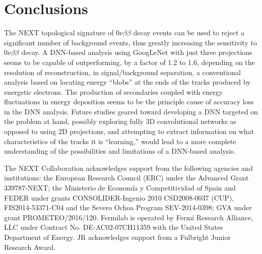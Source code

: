 \documentclass[a4paper,11pt]{article}
\begin{document}
\section{Conclusions}
The NEXT topological signature of $0\nu\beta\beta$ decay events can be used to reject a significant number of background events, thus greatly increasing the sensitivity to $0\nu\beta\beta$ decay.  A DNN-based analysis using GoogLeNet with just three projections seems to be capable of outperforming, by a factor of 1.2 to 1.6, depending on the resolution of reconstruction, in signal/background separation, a conventional analysis based on locating energy ``blobs'' at the ends of the tracks produced by energetic electrons.  The production of secondaries coupled with energy fluctuations in energy deposition seems to be the principle cause of accuracy loss in the DNN analysis.  Future studies geared toward developing a DNN targeted on the problem at hand, possibly exploring fully 3D convolutional networks as opposed to using 2D projections, and attempting to extract information on what characteristics of the tracks it is ``learning,'' would lead to a more complete understanding of the possibilities and limitations of a DNN-based analysis.

\acknowledgments

The NEXT Collaboration acknowledges support from the following agencies and institutions:
the European Research Council (ERC) under the Advanced Grant 339787-NEXT;
the Ministerio de Econom\'{i}a y Competitividad of Spain and FEDER under grants CONSOLIDER-Ingenio
2010 CSD2008-0037 (CUP), FIS2014-53371-C04 and the Severo Ochoa Program
SEV-2014-0398; GVA under grant PROMETEO/2016/120. Fermilab is operated by Fermi Research Alliance, LLC under Contract No. DE-AC02-07CH11359 with the United States Department of 
Energy. JR acknowledges support from a Fulbright Junior Research Award.


\end{document}

